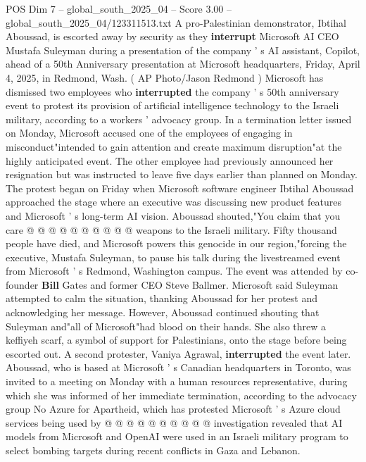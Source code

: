 \begin{textsample}{POS Dim 7 – global\_south\_2025\_04 – Score 3.00 – global\_south\_2025\_04/123311513.txt}  \label{ex:f7_pos_415}
A pro-Palestinian demonstrator, Ibtihal Aboussad, is escorted away by security as they \textbf{interrupt} Microsoft AI CEO Mustafa Suleyman during a presentation of the company ' s AI assistant, Copilot, ahead of a 50th Anniversary presentation at Microsoft headquarters, Friday, April 4, 2025, in Redmond, Wash. ( AP Photo/Jason Redmond ) Microsoft has dismissed two employees who \textbf{interrupted} the company ' s 50th anniversary event to protest its provision of artificial intelligence technology to the Israeli military, according to a workers ' advocacy group.
In a termination letter issued on Monday, Microsoft accused one of the employees of engaging in misconduct"intended to gain attention and create maximum disruption"at the highly anticipated event.
The other employee had previously announced her resignation but was instructed to leave five days earlier than planned on Monday.
The protest began on Friday when Microsoft software engineer Ibtihal Aboussad approached the stage where an executive was discussing new product features and Microsoft ' s long-term AI vision.
Aboussad shouted,"You claim that you care @ @ @ @ @ @ @ @ @ @ weapons to the Israeli military.
Fifty thousand people have died, and Microsoft powers this genocide in our region,"forcing the executive, Mustafa Suleyman, to pause his talk during the livestreamed event from Microsoft ' s Redmond, Washington campus.
The event was attended by co-founder \textbf{Bill} Gates and former CEO Steve Ballmer.
Microsoft said Suleyman attempted to calm the situation, thanking Aboussad for her protest and acknowledging her message.
However, Aboussad continued shouting that Suleyman and"all of Microsoft"had blood on their hands.
She also threw a keffiyeh scarf, a symbol of support for Palestinians, onto the stage before being escorted out.
A second protester, Vaniya Agrawal, \textbf{interrupted} the event later.
Aboussad, who is based at Microsoft ' s Canadian headquarters in Toronto, was invited to a meeting on Monday with a human resources representative, during which she was informed of her immediate termination, according to the advocacy group No Azure for Apartheid, which has protested Microsoft ' s Azure cloud services being used by @ @ @ @ @ @ @ @ @ @ investigation revealed that AI models from Microsoft and OpenAI were used in an Israeli military program to select bombing targets during recent conflicts in Gaza and Lebanon.

\end{textsample}
